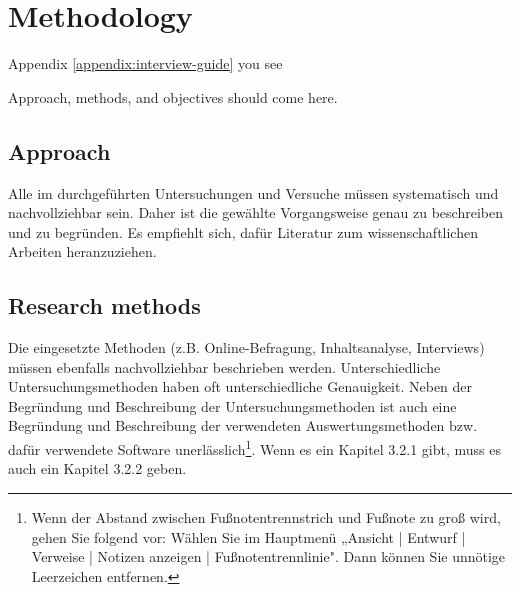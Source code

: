 \chapter{Methodology}

Appendix \ref{appendix:interview-guide} you see

Approach, methods, and objectives should come here.

\section{Approach}
Alle im durchgeführten Untersuchungen und Versuche müssen systematisch und
nachvollziehbar sein. Daher ist die gewählte Vorgangsweise genau zu beschreiben
und zu begründen. Es empfiehlt sich, dafür Literatur zum wissenschaftlichen Arbeiten
heranzuziehen.

\section{Research methods}
Die eingesetzte Methoden (z.B. Online-Befragung, Inhaltsanalyse, Interviews) müssen
ebenfalls nachvollziehbar beschrieben werden.
Unterschiedliche Untersuchungsmethoden haben oft unterschiedliche Genauigkeit.
Neben der Begründung und Beschreibung der Untersuchungsmethoden ist auch eine
Begründung und Beschreibung der verwendeten Auswertungsmethoden bzw. dafür
verwendete Software unerlässlich\footnote{Wenn der Abstand zwischen Fußnotentrennstrich und Fußnote zu groß wird, gehen Sie folgend vor:
	Wählen Sie im Hauptmenü „Ansicht | Entwurf | Verweise | Notizen anzeigen |
	Fußnotentrennlinie". Dann können Sie unnötige Leerzeichen entfernen.
}.
Wenn es ein Kapitel 3.2.1 gibt, muss es auch ein Kapitel 3.2.2 geben.

